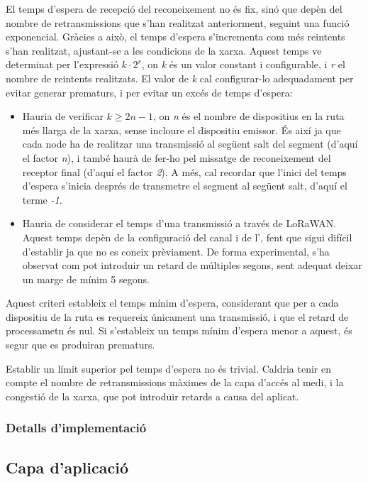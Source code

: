 \documentclass{tfgitic}[2024/07/01]
\begin{document}
{El temps d'espera de recepció del reconeixement no és fix, sinó que depèn del nombre de retransmissions que s'han realitzat anteriorment, seguint una funció exponencial. Gràcies a això, el temps d'espera s'incrementa com més reintents s'han realitzat, ajustant-se a les condicions de la xarxa.
Aquest temps ve determinat per l'expressió $k\cdot 2^r$, on \emph{k} és un valor constant i configurable, i \emph{r} el nombre de reintents realitzats. El valor de \emph{k} cal configurar-lo adequadament per evitar generar  prematurs, i per evitar un excés de temps d'espera:
\begin{itemize}
    \item Hauria de verificar $k\ge 2n-1$, on \emph{n} és el nombre de dispositius en la ruta més llarga de la xarxa, sense incloure el dispositiu emissor. És així ja que cada node ha de realitzar una transmissió al següent salt del segment (d'aquí el factor \emph{n}), i també haurà de fer-ho pel missatge de reconeixement del receptor final (d'aquí el factor \emph{2}). A més, cal recordar que l'inici del temps d'espera s'inicia després de transmetre el segment al següent salt, d'aquí el terme \emph{-1}.
    \item Hauria de considerar el temps d'una transmissió a través de LoRaWAN. Aquest temps depèn de la configuració del canal i de l', fent que sigui difícil d'establir ja que no es coneix prèviament. De forma experimental, s'ha observat com pot introduir un retard de múltiples segons, sent adequat deixar un marge de mínim 5 segons.
\end{itemize}
Aquest criteri estableix el temps mínim d'espera, considerant que per a cada dispositiu de la ruta es requereix únicament una transmissió, i que el retard de processametn és nul. Si s'estableix un temps mínim d'espera menor a aquest, és segur que es produiran  prematurs.

Establir un límit superior pel temps d'espera no és trivial. Caldria tenir en compte el nombre de retransmissions màximes de la capa d'accés al medi, i la congestió de la xarxa, que pot introduir retards a causa del  aplicat. 

\subsubsection{Detalls d'implementació}

\subsection{Capa d’aplicació}
}
\end{document}
